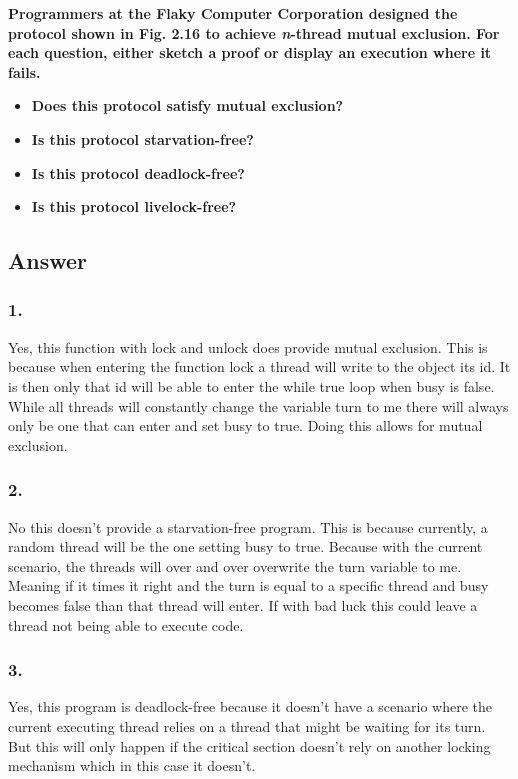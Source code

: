 \documentclass{article}
\begin{document}
\textbf{Programmers at the Flaky Computer Corporation designed the protocol shown in Fig. 2.16 to achieve \textit{n}-thread mutual exclusion. For each question, either sketch a proof or display an execution where it fails.}

\begin{itemize}
    \item \textbf{Does this protocol satisfy mutual exclusion?}
    \item \textbf{Is this protocol starvation-free?}
    \item \textbf{Is this protocol deadlock-free?}
    \item \textbf{Is this protocol livelock-free?}
\end{itemize}

\subsection*{Answer}
\subsubsection*{1.}
Yes, this function with lock and unlock does provide mutual exclusion. This is because when entering the function lock a thread will write to the object its id. It is then only that id will be able to enter the while true loop when busy is false. While all threads will constantly change the variable turn to me there will always only be one that can enter and set busy to true. Doing this allows for mutual exclusion.


\subsubsection*{2.}
No this doesn't provide a starvation-free program. This is because currently, a random thread will be the one setting busy to true. Because with the current scenario, the threads will over and over overwrite the turn variable to me. Meaning if it times it right and the turn is equal to a specific thread and busy becomes false than that thread will enter. If with bad luck this could leave a thread not being able to execute code.


\subsubsection*{3.}
Yes, this program is deadlock-free because it doesn't have a scenario where the current executing thread relies on a thread that might be waiting for its turn. But this will only happen if the critical section doesn't rely on another locking mechanism which in this case it doesn't.
\end{document}
